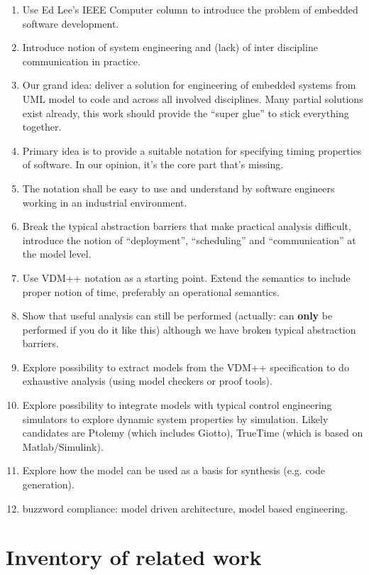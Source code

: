 \documentclass{llncs}
\begin{document}
\begin{enumerate}
\item Use Ed Lee's IEEE Computer column \cite{Lee05} to introduce the problem
of embedded software development.
\item Introduce notion of system engineering and (lack) of inter discipline
communication in practice.
\item Our grand idea: deliver a solution for engineering of embedded systems from
UML model to code and across all involved disciplines. Many partial solutions
exist already, this work should provide the ``super glue'' to stick everything
together.
\item Primary idea is to provide a suitable notation for specifying timing
properties of software. In our opinion, it's the core part that's missing.
\item The notation shall be easy to use and understand by software engineers
working in an industrial environment.
\item Break the typical abstraction barriers that make practical analysis
difficult, introduce the notion of ``deployment'', ``scheduling'' and
``communication'' at the model level.
\item Use VDM++ notation as a starting point. Extend the semantics to include
proper notion of time, preferably an operational semantics.
\item Show that useful analysis can still be performed (actually: can
\textbf{only} be performed if you do it like this) although we have broken
typical abstraction barriers.
\item Explore possibility to extract models from the VDM++ specification to
do exhaustive analysis (using model checkers or proof tools).
\item Explore possibility to integrate models with typical control engineering
simulators to explore dynamic system properties by simulation. Likely
candidates are Ptolemy (which includes Giotto), TrueTime (which is based
on Matlab/Simulink).
\item Explore how the model can be used as a basis for synthesis (e.g. code
generation).
\item buzzword compliance: model driven architecture, model based engineering.
\end{enumerate}

\section{Inventory of related work}
\end{document}
